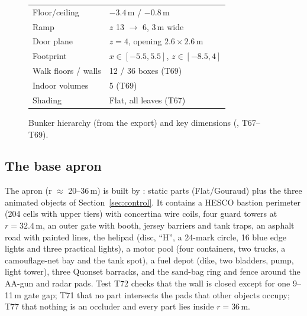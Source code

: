 \begin{figure}[h]
\centering
\begin{minipage}[t]{0.52\linewidth}\vspace{0pt}\end{minipage}\hfill
\begin{minipage}[t]{0.44\linewidth}\vspace{0pt}
\footnotesize
\begin{tabular}{@{}ll@{}}\toprule
Floor/ceiling & $-3.4$\,m / $-0.8$\,m\\
Ramp & $z$ 13 $\to$ 6, 3\,m wide\\
Door plane & $z=4$, opening $2.6\times2.6$\,m\\
Footprint & $x\in[-5.5,5.5]$, $z\in[-8.5,4]$\\
Walk floors / walls & 12 / 36 boxes (T69)\\
Indoor volumes & 5 (T69)\\
Shading & Flat, all leaves (T67)\\\bottomrule
\end{tabular}
\end{minipage}
\caption{Bunker hierarchy (from the export) and key dimensions (, T67--T69).}
\label{fig:tree-bunker}
\end{figure}

\subsection{The base apron}
The apron (r $\approx$ 20--36\,m) is built by : \partsBase{} static parts (Flat/Gouraud) plus the three animated
objects of Section~\ref{sec:control}. It contains a HESCO bastion perimeter (204 cells with upper tiers) with
concertina wire coils, four guard towers at $r=32.4$\,m, an outer gate with booth, jersey barriers and tank traps,
an asphalt road with painted lines, the helipad (disc, ``H'', a 24-mark circle, 16 blue edge lights and three
practical lights), a motor pool (four containers, two trucks, a camouflage-net bay and the tank spot), a fuel depot
(dike, two bladders, pump, light tower), three Quonset barracks, and the sand-bag ring and fence around the AA-gun
and radar pads. Test T72 checks that the wall is closed except for one 9--11\,m gate gap; T71 that no part
intersects the pads that other objects occupy; T77 that nothing is an occluder and every part lies inside $r=36$\,m.

